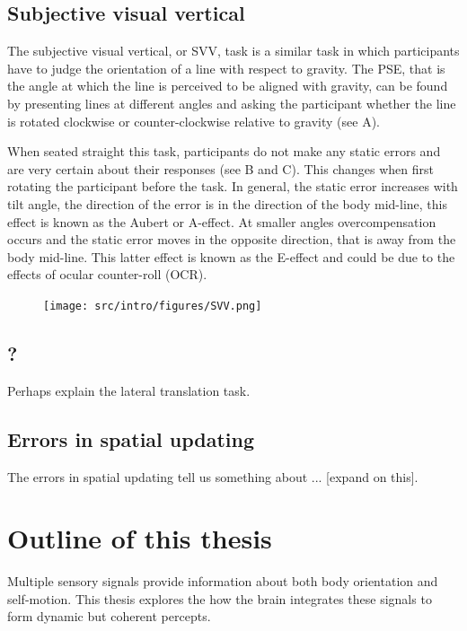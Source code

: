 \subsection{Subjective visual vertical}
The subjective visual vertical, or SVV, task is a similar task in which participants have to judge the orientation of a line with respect to gravity. The PSE, that is the angle at which the line is perceived to be aligned with gravity, can be found by presenting lines at different angles and asking the participant whether the line is rotated clockwise or counter-clockwise relative to gravity (see A).

When seated straight this task, participants do not make any static errors and are very certain about their responses (see B and C). This changes when first rotating the participant before the task. In general, the static error increases with tilt angle, the direction of the error is in the direction of the body mid-line, this effect is known as the Aubert or A-effect. At smaller angles overcompensation occurs and the static error moves in the opposite direction, that is away from the body mid-line. This latter effect is known as the E-effect and could be due to the effects of ocular counter-roll (OCR).

\begin{figure}
    \texttt{[image: src/intro/figures/SVV.png]}

    \caption{}
    \label{intro:fig5}
\end{figure}


\subsection{?}

Perhaps explain the lateral translation task.

\subsection{Errors in spatial updating}

The errors in spatial updating tell us something about ... [expand on this].


\section{Outline of this thesis}
Multiple sensory signals provide information about both body orientation and self-motion. This thesis explores the how the brain integrates these signals to form dynamic but coherent percepts.

